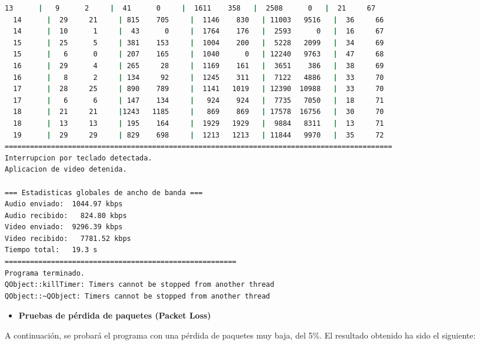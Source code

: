\begin{adjustbox}{max width=\textwidth}
\begin{lstlisting}[language=bash,basicstyle=\ttfamily\scriptsize]
  13      |   9      2     |  41      0     |  1611    358   |  2508      0   |  21     67
  14      |  29     21     | 815    705     |  1146    830   | 11003   9516   |  36     66
  14      |  10      1     |  43      0     |  1764    176   |  2593      0   |  16     67
  15      |  25      5     | 381    153     |  1004    200   |  5228   2099   |  34     69
  15      |   6      0     | 207    165     |  1040      0   | 12240   9763   |  47     68
  16      |  29      4     | 265     28     |  1169    161   |  3651    386   |  38     69
  16      |   8      2     | 134     92     |  1245    311   |  7122   4886   |  33     70
  17      |  28     25     | 890    789     |  1141   1019   | 12390  10988   |  33     70
  17      |   6      6     | 147    134     |   924    924   |  7735   7050   |  18     71
  18      |  21     21     |1243   1185     |   869    869   | 17578  16756   |  30     70
  18      |  13     13     | 195    164     |  1929   1929   |  9884   8311   |  13     71
  19      |  29     29     | 829    698     |  1213   1213   | 11844   9970   |  35     72
============================================================================================
Interrupcion por teclado detectada.
Aplicacion de video detenida.

=== Estadisticas globales de ancho de banda ===
Audio enviado:	1044.97 kbps
Audio recibido:   824.80 kbps
Video enviado:	9296.39 kbps
Video recibido:   7781.52 kbps
Tiempo total: 	19.3 s
=======================================================
Programa terminado.
QObject::killTimer: Timers cannot be stopped from another thread
QObject::~QObject: Timers cannot be stopped from another thread
\end{lstlisting}
\end{adjustbox}
\vspace{\baselineskip}

\newpage

\begin{itemize}
    \item \textbf{Pruebas de pérdida de paquetes (Packet Loss)}
\end{itemize}

A continuación, se probará el programa con una pérdida de paquetes muy baja, del 5\%. El resultado obtenido ha sido el siguiente:
\vspace{\baselineskip}

